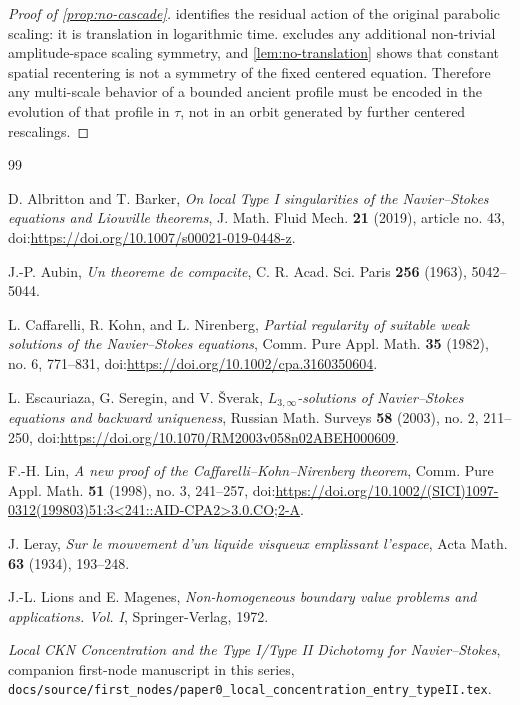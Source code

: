 \documentclass[11pt]{amsart}
\theoremstyle{plain}
\theoremstyle{definition}
\theoremstyle{remark}
\numberwithin{equation}{section}
\begin{document}
\begin{proof}[Proof of \cref{prop:no-cascade}]
 identifies the residual action of the original
parabolic scaling: it is translation in logarithmic time.  
excludes any additional non-trivial amplitude-space scaling symmetry, and
\cref{lem:no-translation} shows that constant spatial recentering is not a
symmetry of the fixed centered equation.  Therefore any multi-scale behavior of
a bounded ancient profile must be encoded in the evolution of that profile in
\(\tau\), not in an orbit generated by further centered rescalings.
\end{proof}

\begin{thebibliography}{99}

D. Albritton and T. Barker,
\emph{On local Type I singularities of the Navier--Stokes equations and
Liouville theorems},
J. Math. Fluid Mech. \textbf{21} (2019), article no. 43,
doi:\url{https://doi.org/10.1007/s00021-019-0448-z}.

J.-P. Aubin,
\emph{Un theoreme de compacite},
C. R. Acad. Sci. Paris \textbf{256} (1963), 5042--5044.

L. Caffarelli, R. Kohn, and L. Nirenberg,
\emph{Partial regularity of suitable weak solutions of the Navier--Stokes equations},
Comm. Pure Appl. Math. \textbf{35} (1982), no. 6, 771--831,
doi:\url{https://doi.org/10.1002/cpa.3160350604}.

L. Escauriaza, G. Seregin, and V. \v{S}verak,
\emph{\(L_{3,\infty}\)-solutions of Navier--Stokes equations and backward uniqueness},
Russian Math. Surveys \textbf{58} (2003), no. 2, 211--250,
doi:\url{https://doi.org/10.1070/RM2003v058n02ABEH000609}.

F.-H. Lin,
\emph{A new proof of the Caffarelli--Kohn--Nirenberg theorem},
Comm. Pure Appl. Math. \textbf{51} (1998), no. 3, 241--257,
doi:\url{https://doi.org/10.1002/(SICI)1097-0312(199803)51:3<241::AID-CPA2>3.0.CO;2-A}.

J. Leray,
\emph{Sur le mouvement d'un liquide visqueux emplissant l'espace},
Acta Math. \textbf{63} (1934), 193--248.

J.-L. Lions and E. Magenes,
\emph{Non-homogeneous boundary value problems and applications. Vol. I},
Springer-Verlag, 1972.

\emph{Local CKN Concentration and the Type I/Type II Dichotomy for
Navier--Stokes},
companion first-node manuscript in this series,
\texttt{docs/source/first\_nodes/paper0\_local\_concentration\_entry\_typeII.tex}.


\end{thebibliography}
\end{document}
